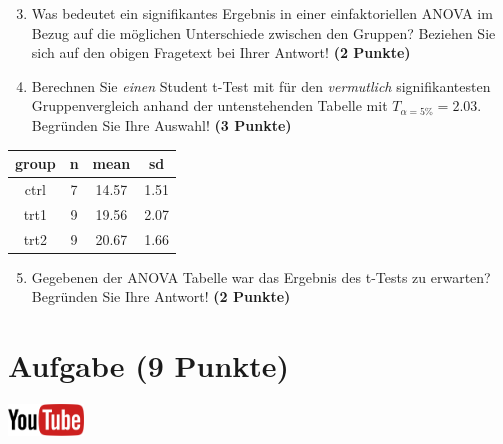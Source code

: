 \documentclass[a4paper, 9pt]{scrartcl}\usepackage[]{graphicx}\usepackage[]{xcolor}
\newenvironment{knitrout}{}{} %
\begin{document}
\vspace{1Ex}

\begin{enumerate}
  \setcounter{enumi}{2}
\item Was bedeutet ein signifikantes Ergebnis in einer einfaktoriellen
  ANOVA im Bezug auf die m{\"o}glichen Unterschiede zwischen den Gruppen? Beziehen Sie sich auf den obigen Fragetext bei Ihrer Antwort!
  \textbf{(2 Punkte)}
\item Berechnen Sie \textit{einen} Student t-Test mit f{\"u}r den \textit{vermutlich}
  signifikantesten Gruppenvergleich anhand der untenstehenden Tabelle mit
  $T_{\alpha = 5\%} = 2.03$. Begr{\"u}nden Sie Ihre Auswahl! \textbf{(3 Punkte)}
\end{enumerate}

\begin{knitrout}
\color{fgcolor}\begin{table}[!h]
\centering
\begin{tabular}{cccc}
\toprule
group & n & mean & sd\\
\midrule
ctrl & 7 & 14.57 & 1.51\\
trt1 & 9 & 19.56 & 2.07\\
trt2 & 9 & 20.67 & 1.66\\
\bottomrule
\end{tabular}
\end{table}

\end{knitrout}

\begin{enumerate}
  \setcounter{enumi}{4}
\item Gegebenen der ANOVA Tabelle war das Ergebnis des t-Tests zu erwarten?
  Begr{\"u}nden Sie Ihre Antwort! \textbf{(2 Punkte)}
\end{enumerate}

 
\clearpage

\section{Aufgabe \hfill (9 Punkte)}

\hfill\href{https://youtu.be/d4CFR2MKX7I}{\includegraphics[width =
  2cm]{img/youtube}}\\[1Ex]
\end{document}
